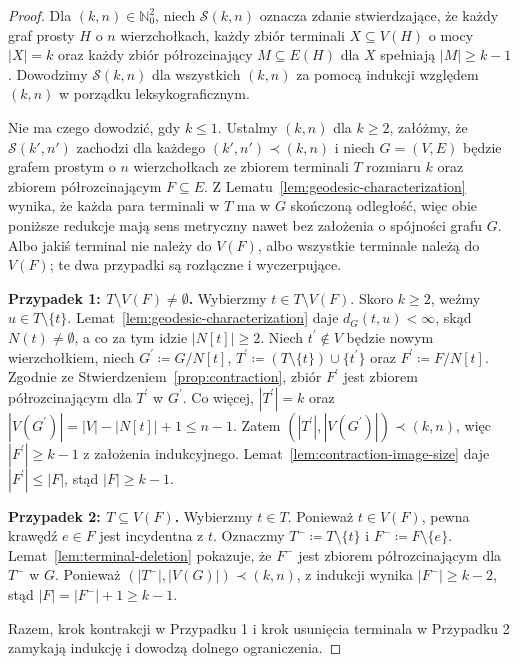 \documentclass[11pt,a4paper]{amsart}
\theoremstyle{definition}
\theoremstyle{plain}
\newcommand{\dist}[3]{d_{#1}(#2,#3)}
\begin{document}
\begin{proof}
Dla $(k,n)\in \mathbb{N}_0^2$, niech $\mathcal{S}(k,n)$ oznacza zdanie stwierdzające, że każdy graf prosty $H$ o $n$ wierzchołkach, każdy zbiór terminali $X\subseteq V(H)$ o mocy $|X|=k$ oraz każdy zbiór półrozcinający $M\subseteq E(H)$ dla $X$ spełniają $|M|\ge k-1$. Dowodzimy $\mathcal{S}(k,n)$ dla wszystkich $(k,n)$ za pomocą indukcji względem $(k,n)$ w porządku leksykograficznym.

Nie ma czego dowodzić, gdy $k\le 1$. Ustalmy $(k,n)$ dla $k\ge 2$, załóżmy, że $\mathcal{S}(k',n')$ zachodzi dla każdego $(k',n')\prec (k,n)$ i niech $G=(V,E)$ będzie grafem prostym o $n$ wierzchołkach ze zbiorem terminali $T$ rozmiaru $k$ oraz zbiorem półrozcinającym $F\subseteq E$. Z Lematu~\ref{lem:geodesic-characterization} wynika, że każda para terminali w $T$ ma w $G$ skończoną odległość, więc obie poniższe redukcje mają sens metryczny nawet bez założenia o spójności grafu $G$. Albo jakiś terminal nie należy do $V(F)$, albo wszystkie terminale należą do $V(F)$; te dwa przypadki są rozłączne i wyczerpujące.

\smallskip\noindent
\textbf{Przypadek 1: $T\setminus V(F)\neq\emptyset$.}
Wybierzmy $t\in T\setminus V(F)$. Skoro $k\ge 2$, weźmy $u\in T\setminus\{t\}$. Lemat~\ref{lem:geodesic-characterization} daje $\dist{G}{t}{u}<\infty$, skąd $N(t)\neq\emptyset$, a co za tym idzie $|N[t]|\ge 2$. Niech $t^\prime\notin V$ będzie nowym wierzchołkiem, niech $G^\prime\coloneqq G/N[t]$, $T^\prime\coloneqq (T\setminus\{t\})\cup\{t^\prime\}$ oraz $F^\prime\coloneqq F/N[t]$. Zgodnie ze Stwierdzeniem~\ref{prop:contraction}, zbiór $F^\prime$ jest zbiorem półrozcinającym dla $T^\prime$ w $G^\prime$. Co więcej, $|T^\prime|=k$ oraz $|V(G^\prime)|=|V|-|N[t]|+1\le n-1$. Zatem $(|T^\prime|,|V(G^\prime)|)\prec (k,n)$, więc $|F^\prime|\ge k-1$ z założenia indukcyjnego. Lemat~\ref{lem:contraction-image-size} daje $|F^\prime|\le |F|$, stąd $|F|\ge k-1$.

\smallskip\noindent
\textbf{Przypadek 2: $T\subseteq V(F)$.}
Wybierzmy $t\in T$. Ponieważ $t\in V(F)$, pewna krawędź $e\in F$ jest incydentna z $t$. Oznaczmy $T^-\coloneqq T\setminus\{t\}$ i $F^-\coloneqq F\setminus\{e\}$. Lemat~\ref{lem:terminal-deletion} pokazuje, że $F^-$ jest zbiorem półrozcinającym dla $T^-$ w $G$. Ponieważ $(|T^-|,|V(G)|)\prec (k,n)$, z indukcji wynika $|F^-|\ge k-2$, stąd $|F|=|F^-|+1\ge k-1$.

Razem, krok kontrakcji w Przypadku 1 i krok usunięcia terminala w Przypadku 2 zamykają indukcję i dowodzą dolnego ograniczenia.
\end{proof}
\end{document}
